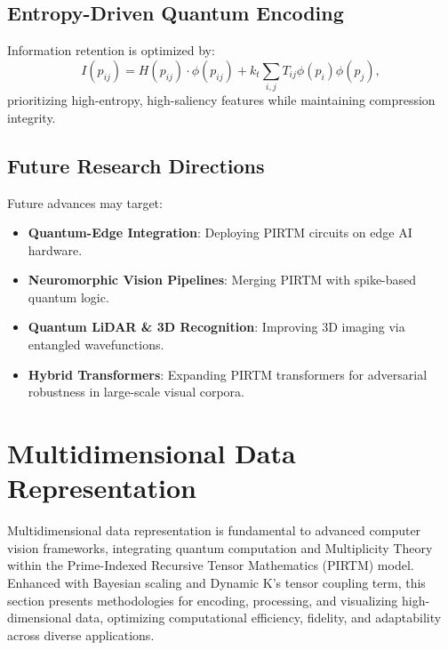 \documentclass{article}
\theoremstyle{plain}
\begin{document}
\subsection{Entropy-Driven Quantum Encoding}
Information retention is optimized by:
\begin{equation}
I(p_{ij}) = H(p_{ij}) \cdot \phi(p_{ij}) + k_t \sum_{i,j} T_{ij} \phi(p_i) \phi(p_j),
\end{equation}
prioritizing high-entropy, high-saliency features while maintaining compression integrity.

\subsection{Future Research Directions}
Future advances may target:
\begin{itemize}
    \item \textbf{Quantum-Edge Integration}: Deploying PIRTM circuits on edge AI hardware.
    \item \textbf{Neuromorphic Vision Pipelines}: Merging PIRTM with spike-based quantum logic.
    \item \textbf{Quantum LiDAR \& 3D Recognition}: Improving 3D imaging via entangled wavefunctions.
    \item \textbf{Hybrid Transformers}: Expanding PIRTM transformers for adversarial robustness in large-scale visual corpora.
\end{itemize}
\section{Multidimensional Data Representation}
Multidimensional data representation is fundamental to advanced computer vision frameworks, integrating quantum computation and Multiplicity Theory within the Prime-Indexed Recursive Tensor Mathematics (PIRTM) model. Enhanced with Bayesian scaling and Dynamic K’s tensor coupling term, this section presents methodologies for encoding, processing, and visualizing high-dimensional data, optimizing computational efficiency, fidelity, and adaptability across diverse applications.
\end{document}
